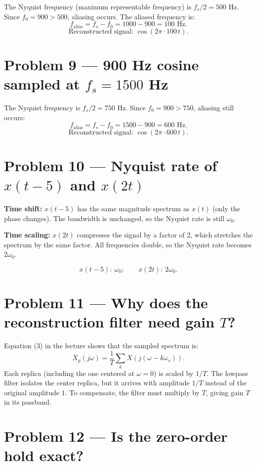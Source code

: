 \documentclass[11pt]{article}
\newcommand{\boxans}[1]{\[\boxed{#1}\]}
\begin{document}
The Nyquist frequency (maximum representable frequency) is $f_s/2 = 500$ Hz. Since $f_0 = 900 > 500$, aliasing occurs. The aliased frequency is:
\[
f_{\text{alias}} = f_s - f_0 = 1000 - 900 = 100 \text{ Hz}.
\]
\boxans{\text{Reconstructed signal: } \cos(2\pi \cdot 100\, t).}

\section*{Problem 9 --- 900 Hz cosine sampled at \texorpdfstring{$f_s = 1500$}{fs = 1500} Hz}

The Nyquist frequency is $f_s/2 = 750$ Hz. Since $f_0 = 900 > 750$, aliasing still occurs:
\[
f_{\text{alias}} = f_s - f_0 = 1500 - 900 = 600 \text{ Hz}.
\]
\boxans{\text{Reconstructed signal: } \cos(2\pi \cdot 600\, t).}

\section*{Problem 10 --- Nyquist rate of \texorpdfstring{$x(t-5)$}{x(t-5)} and \texorpdfstring{$x(2t)$}{x(2t)}}

\textbf{Time shift:} $x(t-5)$ has the same magnitude spectrum as $x(t)$ (only the phase changes). The bandwidth is unchanged, so the Nyquist rate is still $\omega_0$.

\textbf{Time scaling:} $x(2t)$ compresses the signal by a factor of 2, which stretches the spectrum by the same factor. All frequencies double, so the Nyquist rate becomes $2\omega_0$.

\boxans{x(t-5):\ \omega_0; \qquad x(2t):\ 2\omega_0.}

\section*{Problem 11 --- Why does the reconstruction filter need gain \texorpdfstring{$T$}{T}?}

Equation (3) in the lecture shows that the sampled spectrum is:
\[
X_p(j\omega) = \frac{1}{T} \sum_k X\!\left(j(\omega - k\omega_s)\right).
\]
Each replica (including the one centered at $\omega = 0$) is scaled by $1/T$. The lowpass filter isolates the center replica, but it arrives with amplitude $1/T$ instead of the original amplitude $1$. To compensate, the filter must multiply by $T$, giving gain $T$ in its passband.

\section*{Problem 12 --- Is the zero-order hold exact?}
\end{document}
